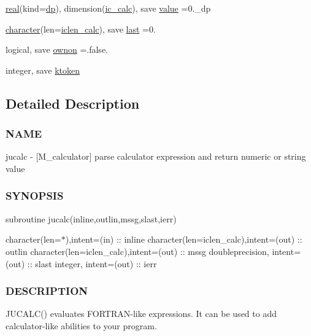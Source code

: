 \begin{DoxyCompactItemize}
\item 
\hyperlink{read__watch_83_8txt_abdb62bde002f38ef75f810d3a905a823}{real}(kind=\hyperlink{namespacem__calculator_aefb5a6c3001bb0f09ed82decb6def950}{dp}), dimension(\hyperlink{namespacem__calculator_a462e5bf8d038196149ba96c22a614284}{ic\+\_\+calc}), save \hyperlink{namespacem__calculator_aeaff519ae0f18ac99095c955fbe12f9d}{value} =0.\+\_\+dp
\item 
\hyperlink{option__stopwatch_83_8txt_abd4b21fbbd175834027b5224bfe97e66}{character}(len=\hyperlink{namespacem__calculator_accf705491e8bd9b3d2f0d04fd13712e7}{iclen\+\_\+calc}), save \hyperlink{namespacem__calculator_a5d0147576a419edafaabfc5d7f1317fc}{last} =\textquotesingle{}0.\textquotesingle{}
\item 
logical, save \hyperlink{namespacem__calculator_a64ba59ad27c2751b72b5880500985b56}{ownon} =.false.
\item 
integer, save \hyperlink{namespacem__calculator_ada86fed286e7bff1456862ab8b5bde47}{ktoken}
\end{DoxyCompactItemize}


\subsection{Detailed Description}
\subsubsection*{N\+A\+ME}

jucalc -\/ \mbox{[}M\+\_\+calculator\mbox{]} parse calculator expression and return numeric or string value \subsubsection*{S\+Y\+N\+O\+P\+S\+IS}

subroutine jucalc(inline,outlin,mssg,slast,ierr)

character(len=$\ast$),intent=(in) \+:\+: inline character(len=iclen\+\_\+calc),intent=(out) \+:\+: outlin character(len=iclen\+\_\+calc),intent=(out) \+:\+: mssg doubleprecision, intent=(out) \+:\+: slast integer, intent=(out) \+:\+: ierr

\subsubsection*{D\+E\+S\+C\+R\+I\+P\+T\+I\+ON}

J\+U\+C\+A\+L\+C() evaluates F\+O\+R\+T\+R\+A\+N-\/like expressions. It can be used to add calculator-\/like abilities to your program.


